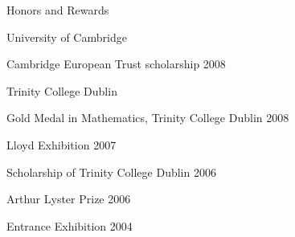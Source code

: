 \documentclass{resume} %
\begin{document}
\begin{rSection}{Honors and Rewards}
\begin{rSubsection}{University of Cambridge}{}{}{}
\item Cambridge European Trust scholarship 2008
\end{rSubsection}
\begin{rSubsection}{Trinity College Dublin}{}{}{}
\item Gold Medal in Mathematics, Trinity College Dublin 2008
\item Lloyd Exhibition 2007
\item Scholarship of Trinity College Dublin 2006
\item Arthur Lyster Prize 2006
\item Entrance Exhibition 2004
\end{rSubsection}
\end{rSection}



%
%





\end{document}
